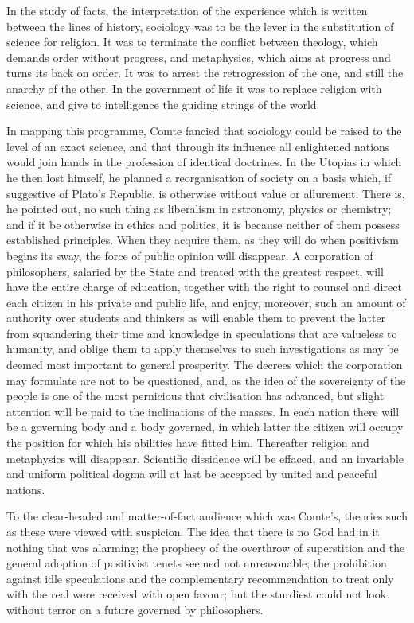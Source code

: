 \documentclass[]{book}
\begin{document}
In the study of facts, the interpretation of the experience which is
written between the lines of history, sociology was to be the lever in
the substitution of science for religion. It was to terminate the
conflict between theology, which demands order without progress, and
metaphysics, which aims at progress and turns its back on order. It was
to arrest the retrogression of the one, and still the anarchy of the
other. In the government of life it was to replace religion with
science, and give to intelligence the guiding strings of the world.

In mapping this programme, Comte fancied that sociology could be raised
to the level of an exact science, and that through its influence all
enlightened nations would join hands in the profession of identical
doctrines. In the Utopias in which he then lost himself, he planned a
reorganisation of society on a basis which, if suggestive of Plato's
Republic, is otherwise without value or allurement. There is, he pointed
out, no such thing as liberalism in astronomy, physics or chemistry; and
if it be otherwise in ethics and politics, it is because neither of them
possess established principles. When they acquire them, as they will do
when positivism begins its sway, the force of public opinion will
disappear. A corporation of philosophers, salaried by the State and
treated with the greatest respect, will have the entire charge of
education, together with the right to counsel and direct each citizen in
his private and public life, and enjoy, moreover, such an amount of
authority over students and thinkers as will enable them to prevent the
latter from squandering their time and knowledge in speculations that
are valueless to humanity, and oblige them to apply themselves to such
investigations as may be deemed most important to general prosperity.
The decrees which the corporation may formulate are not to be
questioned, and, as the idea of the sovereignty of the people is one of
the most pernicious that civilisation has advanced, but slight attention
will be paid to the inclinations of the masses. In each nation there
will be a governing body and a body governed, in which latter the
citizen will occupy the position for which his abilities have fitted
him. Thereafter religion and metaphysics will disappear. Scientific
dissidence will be effaced, and an invariable and uniform political
dogma will at last be accepted by united and peaceful nations.

To the clear-headed and matter-of-fact audience which was Comte's,
theories such as these were viewed with suspicion. The idea that there
is no God had in it nothing that was alarming; the prophecy of the
overthrow of superstition and the general adoption of positivist tenets
seemed not unreasonable; the prohibition against idle speculations and
the complementary recommendation to treat only with the real were
received with open favour; but the sturdiest could not look without
terror on a future governed by philosophers.
\end{document}
